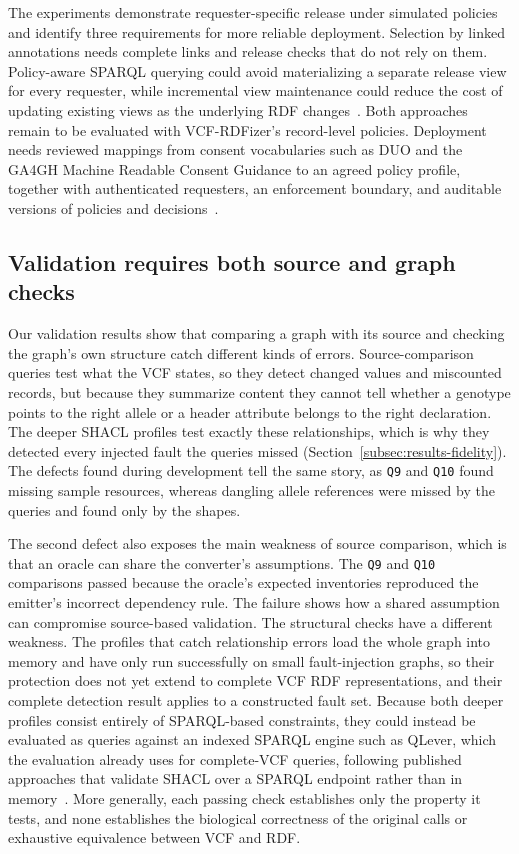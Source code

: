 \documentclass[pdflatex,sn-mathphys-num,referee]{sn-jnl}
\begin{document}
The experiments demonstrate requester-specific release under simulated policies and identify three requirements for more reliable deployment.
Selection by linked annotations needs complete links and release checks that do not rely on them.
Policy-aware SPARQL querying could avoid materializing a separate release view for every requester, while incremental view maintenance could reduce the cost of updating existing views as the underlying RDF changes~\cite{khan2017safe,staquet2026incremental}.
Both approaches remain to be evaluated with VCF-RDFizer's record-level policies.
Deployment needs reviewed mappings from consent vocabularies such as DUO and the GA4GH Machine Readable Consent Guidance to an agreed policy profile, together with authenticated requesters, an enforcement boundary, and auditable versions of policies and decisions~\cite{lawson2021duo,ga4gh_mrcg,rehm2021ga4gh,xacml3_2013}.

\subsection{Validation requires both source and graph checks}\label{subsec:disc-validation}
Our validation results show that comparing a graph with its source and checking the graph's own structure catch different kinds of errors.
Source-comparison queries test what the VCF states, so they detect changed values and miscounted records, but because they summarize content they cannot tell whether a genotype points to the right allele or a header attribute belongs to the right declaration.
The deeper SHACL profiles test exactly these relationships, which is why they detected every injected fault the queries missed (Section~\ref{subsec:results-fidelity}).
The defects found during development tell the same story, as \texttt{Q9} and \texttt{Q10} found missing sample resources, whereas dangling allele references were missed by the queries and found only by the shapes.

The second defect also exposes the main weakness of source comparison, which is that an oracle can share the converter's assumptions.
The \texttt{Q9} and \texttt{Q10} comparisons passed because the oracle's expected inventories reproduced the emitter's incorrect dependency rule.
The failure shows how a shared assumption can compromise source-based validation.
The structural checks have a different weakness.
The profiles that catch relationship errors load the whole graph into memory and have only run successfully on small fault-injection graphs, so their protection does not yet extend to complete VCF RDF representations, and their complete detection result applies to a constructed fault set.
Because both deeper profiles consist entirely of SPARQL-based constraints, they could instead be evaluated as queries against an indexed SPARQL engine such as QLever, which the evaluation already uses for complete-VCF queries, following published approaches that validate SHACL over a SPARQL endpoint rather than in memory~\cite{corman2019validating,figuera2021travshacl}.
More generally, each passing check establishes only the property it tests, and none establishes the biological correctness of the original calls or exhaustive equivalence between VCF and RDF.
\end{document}
